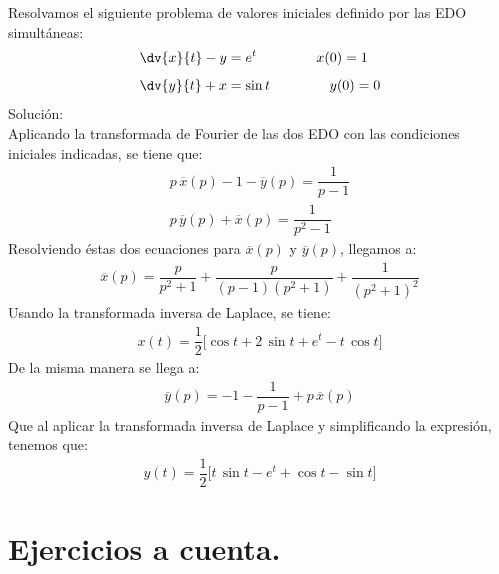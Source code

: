 \begin{ejemplo}
Resolvamos el siguiente problema de valores iniciales definido por las EDO simultáneas:
\begin{align*}
\dv{x}{t} - y &= e^{t} \hspace{1.5cm} x(0) =  1 \\[0.5em]
\dv{y}{t} + x &= \sin t \hspace{1.5cm} y(0) =  0
\end{align*}
Solución:
\\[0.5em]
Aplicando la transformada de Fourier de las dos EDO con las condiciones iniciales indicadas, se tiene que:
\begin{align*}
p \, \overline{x} (p) - 1 - \overline{y} (p) = \dfrac{1}{p -1} \\[0.5em]
p \, \overline{y} (p) + \overline{x} (p) = \dfrac{1}{p^{2} -1}
\end{align*}
Resolviendo éstas dos ecuaciones para $\overline{x}(p)$ y $\overline{y}(p)$, llegamos a:
\begin{align*}
\overline{x}(p) = \dfrac{p}{p^{2} + 1} + \dfrac{p}{(p - 1)(p^{2} + 1)} + \dfrac{1}{(p^{2} + 1)^{2}}
\end{align*}
Usando la transformada inversa de Laplace, se tiene:
\begin{align*}
x(t) = \dfrac{1}{2} \big[ \cos t + 2 \, \sin t +  e^{t} - t \, \cos t \big]
\end{align*}
De la misma manera se llega a:
\begin{align*}
\overline{y} (p) = - 1 - \dfrac{1}{p - 1} + p \, \overline{x} (p)
\end{align*}
Que al aplicar la transformada inversa de Laplace y simplificando la expresión, tenemos que:
\begin{align*}
y(t)= \dfrac{1}{2} \big[ t \, \sin t - e^{t} + \cos t - \sin t \big]
\end{align*}
\end{ejemplo}

\section{Ejercicios a cuenta.}

